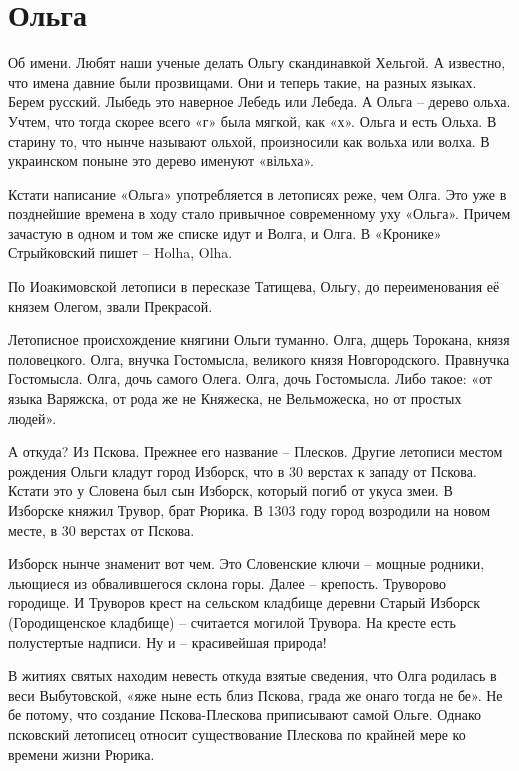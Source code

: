\chapter{Ольга}

Об имени. Любят наши ученые делать Ольгу скандинавкой Хельгой. А известно, что имена давние были прозвищами. Они и теперь такие, на разных языках. Берем русский. Лыбедь это наверное Лебедь или Лебеда. А Ольга – дерево ольха. Учтем, что тогда скорее всего «г» была мягкой, как «х». Ольга и есть Ольха. В старину то, что нынче называют ольхой, произносили как вольха или волха. В украинском поныне это дерево именуют «вільха».


Кстати написание «Ольга» употребляется в летописях реже, чем Олга. Это уже в позднейшие времена в ходу стало привычное современному уху «Ольга». Причем зачастую в одном и том же списке идут и Волга, и Олга. В «Кронике» Стрыйковский пишет – Holha, Olha.

По Иоакимовской летописи в пересказе Татищева, Ольгу, до переименования её князем Олегом, звали Прекрасой.

Летописное происхождение княгини Ольги туманно. Олга, дщерь Торокана, князя половецкого. Олга, внучка Гостомысла, великого князя Новгородского. Правнучка Гостомысла. Олга, дочь самого Олега. Олга, дочь Гостомысла. Либо такое: «от языка Варяжска, от рода же не Княжеска, не Вельможеска, но от простых людей».

А откуда? Из Пскова. Прежнее его название – Плесков. Другие летописи местом рождения Ольги кладут город Изборск, что в 30 верстах к западу от Пскова. Кстати это у Словена был сын Изборск, который погиб от укуса змеи. В Изборске княжил Трувор, брат Рюрика. В 1303 году город возродили на новом месте, в 30 верстах от Пскова. 

Изборск нынче знаменит вот чем. Это Словенские ключи – мощные родники, льющиеся из обвалившегося склона горы. Далее – крепость. Труворово городище. И Труворов крест на сельском кладбище деревни Старый Изборск (Городищенское кладбище) – считается могилой Трувора. На кресте есть полустертые надписи. Ну и – красивейшая природа! 

В житиях святых находим невесть откуда взятые сведения, что Олга родилась в веси Выбутовской, «яже ныне есть близ Пскова, града же онаго тогда не бе». Не бе потому, что создание Пскова-Плескова приписывают самой Ольге. Однако псковский летописец относит существование Плескова по крайней мере ко времени жизни Рюрика.

